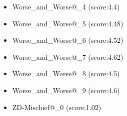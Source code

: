\begin{appendices}
\begin{itemize}
\begin{multicols}{3}
\begin{itemize}
                \item Worse\_and\_Worse@\_4 (score:4.4)
                \item Worse\_and\_Worse@\_5 (score:4.48)
                \item Worse\_and\_Worse@\_6 (score:4.52)
                \item Worse\_and\_Worse@\_7 (score:4.62)
                \item Worse\_and\_Worse@\_8 (score:4.5)
                \item Worse\_and\_Worse@\_9 (score:4.6)
                \item ZD-Mischief@\_0 (score:1.02)
            \end{itemize}
        \end{multicols}
    \end{itemize}
    

\end{appendices}